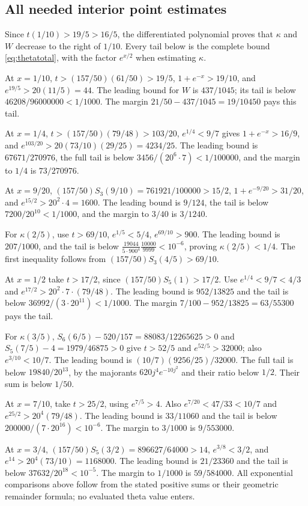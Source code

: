 \subsection{All needed interior point estimates}
Since $t(1/10)>19/5>16/5$, the differentiated polynomial proves that
$\kappa$ and $W$ decrease to the right of $1/10$.
Every tail below is the complete bound \eqref{eq:thetatotal}, with the factor $e^{x/2}$ when estimating $\kappa$.

At $x=1/10$,
$t>(157/50)(61/50)>19/5$,
$1+e^{-x}>19/10$, and $e^{19/5}>20(11/5)=44$.
The leading bound for $W$ is $437/1045$; its tail is below
$46208/96000000<1/1000$.
The margin $21/50-437/1045=19/10450$ pays this tail.

At $x=1/4$, $t>(157/50)(79/48)>103/20$,
$e^{1/4}<9/7$ gives $1+e^{-x}>16/9$, and
$e^{103/20}>20(73/10)(29/25)=4234/25$.
The leading bound is $67671/270976$, the full tail is below
$3456/(20^6\cdot7)<1/100000$, and the margin to $1/4$ is
$73/270976$.

At $x=9/20$,
$(157/50)S_3(9/10)=761921/100000>15/2$,
$1+e^{-9/20}>31/20$, and $e^{15/2}>20^2\cdot4=1600$.
The leading bound is $9/124$, the tail is below $7200/20^{10}<1/1000$,
and the margin to $3/40$ is $3/1240$.

For $\kappa(2/5)$, use $t>69/10$, $e^{1/5}<5/4$,
$e^{69/10}>900$.
The leading bound is $207/1000$, and the tail is below
$\frac{19044}{5\cdot900^4}\frac{10000}{9999}<10^{-6}$,
proving $\kappa(2/5)<1/4$.
The first inequality follows from $(157/50)S_3(4/5)>69/10$.

At $x=1/2$ take $t>17/2$, since $(157/50)S_5(1)>17/2$.
Use $e^{1/4}<9/7<4/3$ and $e^{17/2}>20^2\cdot7\cdot(79/48)$.
The leading bound is $952/13825$ and the tail is below
$36992/(3\cdot20^{11})<1/1000$.
The margin $7/100-952/13825=63/55300$ pays the tail.

For $\kappa(3/5)$,
$S_6(6/5)-520/157=88083/12265625>0$ and
$S_5(7/5)-4=1979/46875>0$ give $t>52/5$ and
$e^{52/5}>32000$; also $e^{3/10}<10/7$.
The leading bound is $(10/7)(9256/25)/32000$.
The full tail is below $19840/20^{13}$, by the majorants
$620j^4e^{-10j^2}$ and their ratio below $1/2$.
Their sum is below $1/50$.

At $x=7/10$, take $t>25/2$, using $e^{7/5}>4$.
Also $e^{7/20}<47/33<10/7$ and
$e^{25/2}>20^4(79/48)$.
The leading bound is $33/11060$ and the tail is below
$200000/(7\cdot20^{16})<10^{-6}$.
The margin to $3/1000$ is $9/553000$.

At $x=3/4$,
$(157/50)S_5(3/2)=896627/64000>14$,
$e^{3/8}<3/2$, and $e^{14}>20^4(73/10)=1168000$.
The leading bound is $21/23360$ and the tail is below
$37632/20^{18}<10^{-5}$.
The margin to $1/1000$ is $59/584000$.
All exponential comparisons above follow from the stated positive sums or their geometric remainder formula; no evaluated theta value enters.

